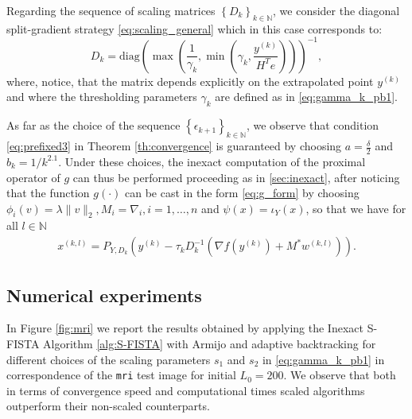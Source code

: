 \documentclass[conference]{IEEEtran}
\begin{document}
Regarding the sequence of scaling matrices $\left\{D_k\right\}_{k\in\mathbb{N}}$, we consider the diagonal split-gradient strategy \eqref{eq:scaling_general} which in this case corresponds to:
\begin{equation}  \label{eq:metric_KL}
    D_k = \text{diag}\left(\max\left(\frac{1}{\gamma_k},\min\left(\gamma_k, \frac{y^{(k)}}{H^T e}\right)\right)\right)^{-1},
\end{equation}
where, notice, that the matrix depends explicitly on the extrapolated point $y^{(k)}$ and
where the thresholding parameters $\gamma_k$ are defined as in \eqref{eq:gamma_k_pb1}. 

As far as the choice of the sequence $\left\{\epsilon_{k+1}\right\}_{k\in\mathbb{N}}$,
we observe that condition  \eqref{eq:prefixed3} in Theorem \ref{th:convergence} is guaranteed by choosing $a=\frac{\delta}{2}$ and $b_k=1/k^{2.1}$.  Under these choices, the inexact computation of the proximal operator of $g$ can thus be performed proceeding as in \ref{sec:inexact}, after noticing that the function $g(\cdot)$ can be cast in the form \eqref{eq:g_form} by choosing $\phi_i(v) = \lambda \|v\|_2, M_i =  \nabla_i, i=1,\ldots,n$ and $\psi(x) = \iota_{Y}(x) $, so that we have for all $ l\in\mathbb{N}$
\begin{align}
x^{(k,l)}  
 = P_{Y,D_k}  \left( y^{(k)}-\tau_k D_{k}^{-1}\left(\nabla f(y^{(k)})   + M^* w^{(k,l)} \right)  \right). \label{eq:primal_scaled}
\end{align}

\subsection{Numerical experiments}

In Figure \ref{fig:mri} we report the results obtained by applying the Inexact S-FISTA Algorithm \ref{alg:S-FISTA} with Armijo and adaptive backtracking for different choices of the scaling parameters $s_1$ and $s_2$ in \eqref{eq:gamma_k_pb1} in correspondence of the \texttt{mri} test image for initial $L_0=200$. We observe that both in terms of convergence speed and computational times scaled algorithms outperform their non-scaled counterparts. 
\end{document}
